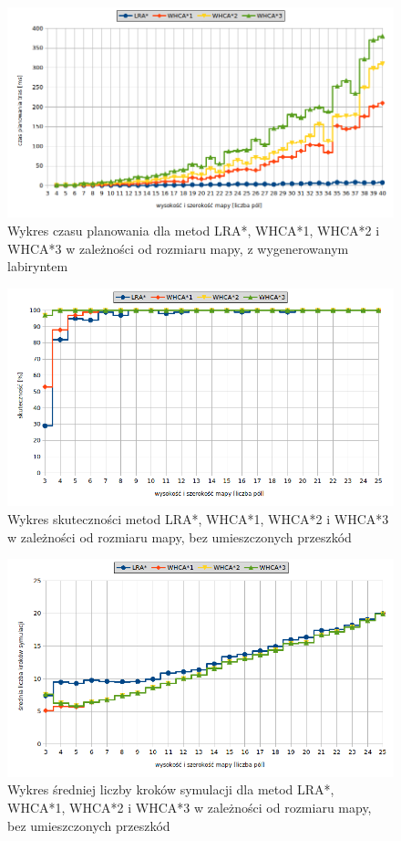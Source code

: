 \begin{figure}
	\centering
	\includegraphics[width=0.8\columnwidth]{img/plots/test-steps-maze-mapsize-calctime}
	\caption{Wykres czasu planowania dla metod LRA*, WHCA*1, WHCA*2 i WHCA*3 w zależności od rozmiaru mapy, z wygenerowanym labiryntem}
	\label{fig:test-steps-maze-mapsize-calctime}
\end{figure}
\begin{figure}
	\centering
	\includegraphics[width=0.8\columnwidth]{img/plots/test-steps-empty-mapsize-eff}
	\caption{Wykres skuteczności metod LRA*, WHCA*1, WHCA*2 i WHCA*3 w zależności od rozmiaru mapy, bez umieszczonych przeszkód}
	\label{fig:test-steps-empty-mapsize-eff}
\end{figure}
\begin{figure}
	\centering
	\includegraphics[width=0.8\columnwidth]{img/plots/test-steps-empty-mapsize-steps}
	\caption{Wykres średniej liczby kroków symulacji dla metod LRA*, WHCA*1, WHCA*2 i WHCA*3 w zależności od rozmiaru mapy, bez umieszczonych przeszkód}
	\label{fig:test-steps-empty-mapsize-steps}
\end{figure}
